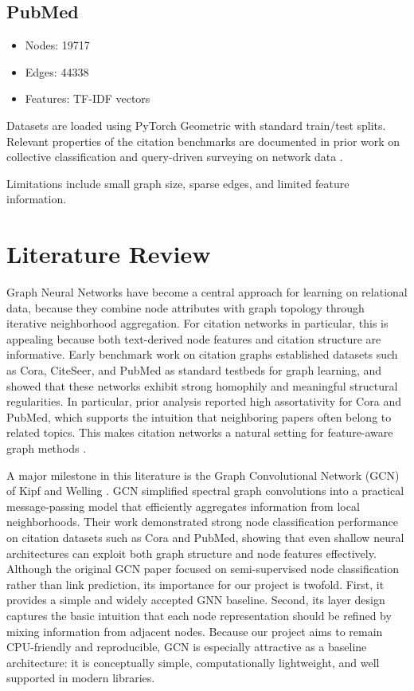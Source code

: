 \documentclass[11pt,a4paper]{article}
\begin{document}
\subsection{PubMed}
\begin{itemize}
\item Nodes: 19717
\item Edges: 44338
\item Features: TF-IDF vectors
\end{itemize}

Datasets are loaded using PyTorch Geometric with standard train/test splits.
Relevant properties of the citation benchmarks are documented in prior work on collective
classification and query-driven surveying on network data \cite{sen2008collective,namata2012query}.

Limitations include small graph size, sparse edges, and limited feature information.

\section{Literature Review}

Graph Neural Networks have become a central approach for learning on relational data,
because they combine node attributes with graph topology through iterative neighborhood aggregation.
For citation networks in particular, this is appealing because both text-derived node features
and citation structure are informative.
Early benchmark work on citation graphs established datasets such as Cora, CiteSeer, and PubMed
as standard testbeds for graph learning, and showed that these networks exhibit strong homophily
and meaningful structural regularities.
In particular, prior analysis reported high assortativity for Cora and PubMed,
which supports the intuition that neighboring papers often belong to related topics.
This makes citation networks a natural setting for feature-aware graph methods
\cite{sen2008collective,namata2012query}.

A major milestone in this literature is the Graph Convolutional Network (GCN) of
Kipf and Welling \cite{kipf2017semi}.
GCN simplified spectral graph convolutions into a practical message-passing model
that efficiently aggregates information from local neighborhoods.
Their work demonstrated strong node classification performance on citation datasets such as
Cora and PubMed, showing that even shallow neural architectures can exploit both graph structure
and node features effectively.
Although the original GCN paper focused on semi-supervised node classification rather than link prediction,
its importance for our project is twofold.
First, it provides a simple and widely accepted GNN baseline.
Second, its layer design captures the basic intuition that each node representation should be refined
by mixing information from adjacent nodes.
Because our project aims to remain CPU-friendly and reproducible,
GCN is especially attractive as a baseline architecture:
it is conceptually simple, computationally lightweight, and well supported in modern libraries.
\end{document}
